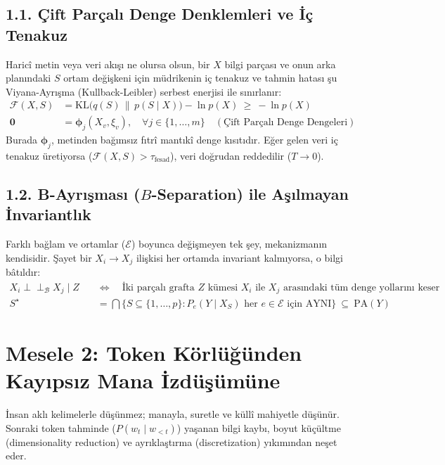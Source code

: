 \documentclass[11pt, a4paper]{article}
\begin{document}
\subsection{1.1. Çift Parçalı Denge Denklemleri ve İç Tenakuz}
Haricî metin veya veri akışı ne olursa olsun, bir $X$ bilgi parçası ve onun arka planındaki $S$ ortam değişkeni için müdrikenin iç tenakuz ve tahmin hatası şu Viyana-Ayrışma (Kullback-Leibler) serbest enerjisi ile sınırlanır:
\begin{align}
\mathcal{F}(X, S) &= \text{KL}\big( q(S) \,\|\, p(S \mid X) \big) - \ln p(X) \ \ge \ -\ln p(X) \\
\mathbf{0} &= \bm{\phi}_j(X_v, \xi_v), \quad \forall j \in \{1, \dots, m\} \quad (\text{Çift Parçalı Denge Dengeleri})
\end{align}
Burada $\bm{\phi}_j$, metinden bağımsız fıtrî mantıkî denge kısıtıdır. Eğer gelen veri iç tenakuz üretiyorsa ($\mathcal{F}(X, S) > \tau_{\text{fesad}}$), veri doğrudan reddedilir ($T \to 0$).

\subsection{1.2. B-Ayrışması ($B$-Separation) ile Aşılmayan İnvariantlık}
Farklı bağlam ve ortamlar ($\mathcal{E}$) boyunca değişmeyen tek şey, mekanizmanın kendisidir. Şayet bir $X_i \to X_j$ ilişkisi her ortamda invariant kalmıyorsa, o bilgi bâtıldır:
\begin{align}
X_i \perp\!\!\!\perp_{\mathcal{B}} X_j \mid Z \quad &\iff \quad \text{İki parçalı grafta } Z \text{ kümesi } X_i \text{ ile } X_j \text{ arasındaki tüm denge yollarını keser} \\
S^{\star} &= \bigcap \big\{ S \subseteq \{1,\dots,p\} : P_e(Y \mid X_S) \text{ her } e \in \mathcal{E} \text{ için AYNI} \big\} \ \subseteq \ \text{PA}(Y)
\end{align}

\section{Mesele 2: Token Körlüğünden Kayıpsız Mana İzdüşümüne}

İnsan aklı kelimelerle düşünmez; manayla, suretle ve küllî mahiyetle düşünür. Sonraki token tahminde ($P(w_t \mid w_{<t})$) yaşanan bilgi kaybı, boyut küçültme (dimensionality reduction) ve ayrıklaştırma (discretization) yıkımından neşet eder.
\end{document}
